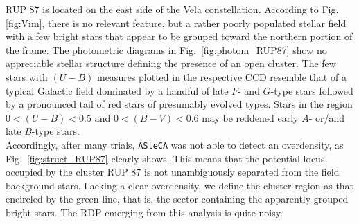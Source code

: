 \documentclass[draft]{aa}
\begin{document}
RUP 87 is located on the east side of the Vela constellation. According to Fig.
\ref{fig:Vim}, there is no relevant feature, but a rather
poorly populated stellar field with a few bright stars
that appear to be grouped  toward the northern portion of the frame.
The photometric diagrams in Fig.~\ref{fig:photom_RUP87} show no appreciable
stellar structure defining the presence of an open cluster.
The few stars with $(U-B)$ measures plotted in the respective CCD
resemble that of a typical Galactic field dominated by a handful of late $F$-
and $G$-type stars followed by a pronounced tail of red stars of presumably
evolved types. Stars in the region $0<(U-B)<0.5$ and $0<(B-V)<0.6$ may be
reddened early $A$- or/and late $B$-type stars.\\

Accordingly, after many trials, \texttt{ASteCA} was not able to detect
an overdensity, as Fig.~\ref{fig:struct_RUP87} clearly shows.
This means that the potential locus occupied by the cluster RUP 87 is not
unambiguously separated from the field background stars.
Lacking a clear overdensity, we define the cluster region as that encircled by
the green line, that is, the sector containing the apparently grouped bright
stars. The RDP emerging from this analysis is quite noisy.
\end{document}
